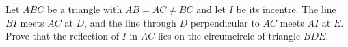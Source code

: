 Let $ABC$ be a triangle with $AB = AC \neq BC$ and let $I$ be its incentre. The line $BI$ meets $AC$ at $D$, and the line through $D$ perpendicular to $AC$ meets $AI$ at $E$. Prove that the reflection of $I$ in $AC$ lies on the circumcircle of triangle $BDE$.
